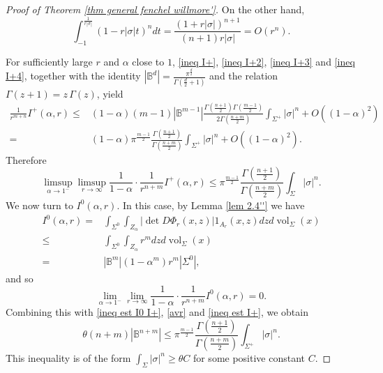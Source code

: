 \documentclass[11pt, reqno]{amsart}
\numberwithin{equation}{section}
\begin{document}
\begin{proof}[Proof of Theorem \ref{thm general fenchel willmore'}]
On the other hand,
\begin{equation}\label{ineq I+4}
\int_{-1}^{\frac{1}{r|\sigma|}}(1-r|\sigma| t)^n d t=
\frac{(1+r|\sigma|)^{n+1}}{(n+1) r|\sigma|}=O(r^n).
\end{equation}

For sufficiently large $r$ and $\alpha$ close to $1$, \eqref{ineq I+}, \eqref{ineq I+2}, \eqref{ineq I+3} and \eqref{ineq I+4}, together with the identity $\left|\mathbb{B}^d\right| = \frac{\pi^{\frac{d}{2}}}{\Gamma\left(\frac{d}{2} + 1\right)}$ and the relation $\Gamma(z + 1) = z\, \Gamma(z)$, yield
\begin{equation*}
\begin{aligned}
\frac{1}{r^{m+n}}I^{+}(\alpha, r)
\le& (1-\alpha)(m-1)\left|\mathbb{B}^{m-1}\right|\frac{\Gamma\left(\frac{n+1}{2}\right) \Gamma\left(\frac{m-1}{2}\right)}{2 \Gamma\left(\frac{n+m}{2}\right)}\int_{\Sigma^+}|\sigma|^n+O((1-\alpha)^2)\\
=& (1-\alpha)\pi^{\frac{m-1}{2}} \frac{\Gamma\left(\frac{n+1}{2}\right)}{\Gamma\left(\frac{n+m}{2}\right)} \int_{\Sigma^+} |\sigma|^n +O((1-\alpha)^2).
\end{aligned}
\end{equation*}
Therefore
\begin{equation}\label{ineq est I+}
\limsup_{\alpha \rightarrow 1^{-}} \limsup_{r \rightarrow \infty} \frac{1}{1-\alpha} \cdot \frac{1}{r^{n+m}} I^{+}(\alpha, r) \le
\pi^{\frac{m-1}{2}} \frac{\Gamma\left(\frac{n+1}{2}\right)}{\Gamma\left(\frac{n+m}{2}\right)} \int_{\Sigma}|\sigma|^n.
\end{equation}
We now turn to $I^0(\alpha, r)$. In this case, by Lemma \ref{lem 2.4''} we have
\begin{equation*}
\begin{aligned}
I^0(\alpha, r)=& \int_{\Sigma^0} \int_{Z_\alpha}\left|\det D\Phi_r(x, z)\right| 1_{A_r}(x, z) d z d \operatorname{vol}_{\Sigma}(x)\\
\le& \int_{\Sigma^0} \int_{Z_\alpha}r^m d z d \operatorname{vol}_{\Sigma}(x)\\
=& |\mathbb B^m|(1-\alpha^m)r^m |\Sigma^0|,
\end{aligned}
\end{equation*}
and so
$$
\lim_{\alpha \rightarrow 1^{-}} \lim_{r \rightarrow \infty} \frac{1}{1-\alpha} \cdot \frac{1}{r^{n+m}} I^0(\alpha, r)=0.
$$
Combining this with \eqref{ineq est I0 I+}, \eqref{avr} and \eqref{ineq est I+}, we obtain
$$
\theta(n+m)\left|\mathbb{B}^{n+m}\right| \le \pi^{\frac{m-1}{2}} \frac{\Gamma\left(\frac{n+1}{2}\right)}{\Gamma\left(\frac{n+m}{2}\right)} \int_{\Sigma^{+}}|\sigma|^n.
$$
This inequality is of the form $\int_{\Sigma}|\sigma|^n \ge \theta C$ for some positive constant $C$.


\end{proof}
\end{document}
